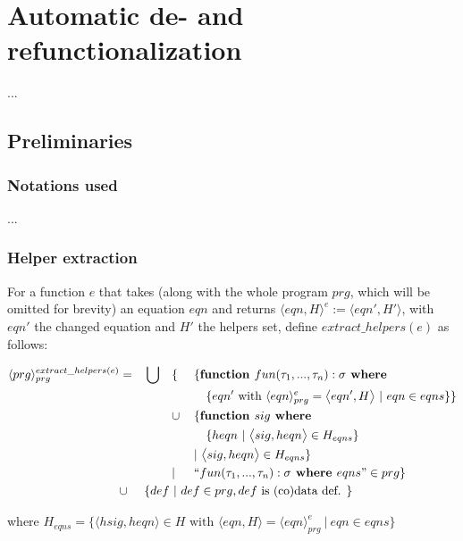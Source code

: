\chapter{Automatic de- and refunctionalization}

...

\section{Preliminaries}

\subsection{Notations used}

...

\subsection{Helper extraction}

For a function $e$ that takes (along with the whole program $prg$, which will be omitted for brevity) an equation $eqn$ and returns $\langle eqn, H \rangle^e := \big\langle eqn', H' \big\rangle$, with $eqn'$ the changed equation and $H'$ the helpers set, define $extract\_helpers(e)$ as follows:

\begin{alignat*}{4}
\langle prg \rangle^{extract\_helpers(e)}_{prg} & = &&\bigcup &&\{ ~&&\{ \textrm{\textbf{function }} fun(\tau_1, ..., \tau_n): \sigma \textrm{\textbf{ where }} \\
& && && &&\quad \{ eqn' \textrm{ with } \langle eqn \rangle^{e}_{prg} = \big\langle eqn', H \big\rangle ~ | ~ eqn \in eqns \} \} \\
& && && \cup && \{ \textrm{\textbf{function }} sig \textrm{\textbf{ where }} \\
& && && &&\quad \{ heqn ~ | ~ \big\langle sig, heqn \big\rangle \in H_{eqns} \} \\
& && && && | ~  \big\langle sig, heqn \big\rangle \in H_{eqns} \} \\
& && && | && `` fun (\tau_1, ..., \tau_n): \sigma \textrm{\textbf{ where }} eqns " \in prg \} \\
& \cup && \{ def ~ | ~ def \in prg, def \textrm{ is (co)data def. } \} \span\span\span\span
\end{alignat*}

where $H_{eqns} = \{ \big\langle hsig, heqn \big\rangle \in H \textrm{ with } \big\langle eqn, H \big\rangle = \langle eqn \rangle^{e}_{prg} ~ | ~ eqn \in eqns \}$

